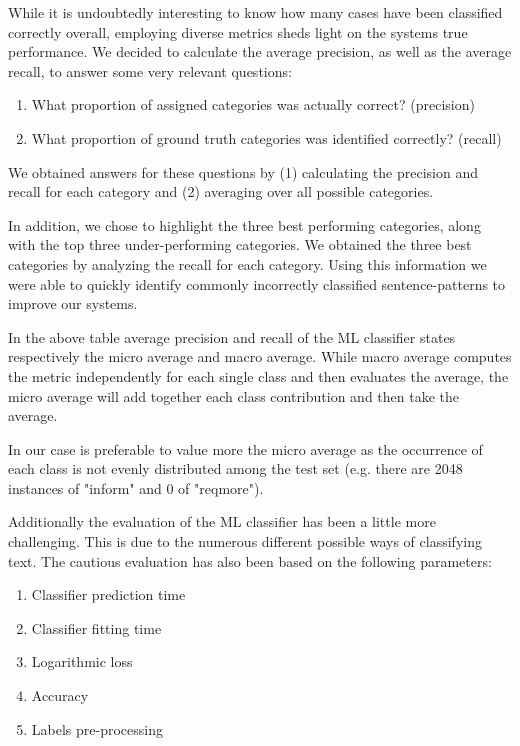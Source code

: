 \documentclass[a4paper]{article}
\begin{document}
\vspace*{15px}

While it is undoubtedly interesting to know how many cases have been classified correctly overall, employing diverse metrics sheds light on the systems true performance. We decided to calculate the average precision, as well as the average recall, to answer some very relevant questions:
\begin{enumerate}
    \item What proportion of assigned categories was actually correct? (precision)
    \item What proportion of ground truth categories was identified correctly? (recall)
\end{enumerate}{} 
We obtained answers for these questions by (1) calculating the precision and recall for each category and (2) averaging over all possible categories. 

In addition, we chose to highlight the three best performing categories, along with the top three under-performing categories. We obtained the three best categories by analyzing the recall for each category. Using this information we were able to quickly identify commonly incorrectly classified sentence-patterns to improve our systems.

In the above table average precision and recall of the ML classifier states respectively the micro average and macro average.
While macro average computes the metric independently for each single class and then evaluates the average, the micro average will add together each class contribution and then take the average.

In our case is preferable to value more the micro average as the occurrence of each class is not evenly distributed among the test set (e.g. there are 2048 instances of "inform" and 0 of "reqmore"). 

Additionally the evaluation of the ML classifier has been a little more challenging. 
This is due to the numerous different possible ways of classifying text.
The cautious evaluation has also been based on the following parameters:
\begin{multicols}{2}
\begin{enumerate}
    \item Classifier prediction time
    \item Classifier fitting time
    \item Logarithmic loss
    \item Accuracy
    \item Labels pre-processing   
\end{enumerate}
\end{multicols}
\end{document}
